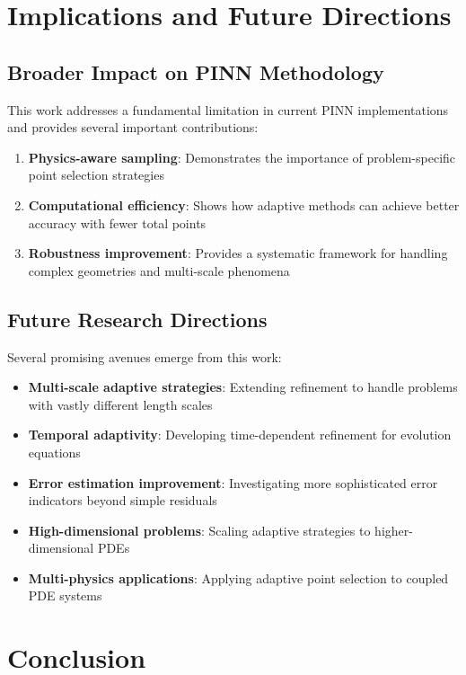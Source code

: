 \documentclass[11pt,a4paper]{article}
\begin{document}
\section{Implications and Future Directions}

\subsection{Broader Impact on PINN Methodology}

This work addresses a fundamental limitation in current PINN implementations and provides several important contributions:

\begin{enumerate}
    \item \textbf{Physics-aware sampling}: Demonstrates the importance of problem-specific point selection strategies
    \item \textbf{Computational efficiency}: Shows how adaptive methods can achieve better accuracy with fewer total points
    \item \textbf{Robustness improvement}: Provides a systematic framework for handling complex geometries and multi-scale phenomena
\end{enumerate}

\subsection{Future Research Directions}

Several promising avenues emerge from this work:

\begin{itemize}
    \item \textbf{Multi-scale adaptive strategies}: Extending refinement to handle problems with vastly different length scales
    \item \textbf{Temporal adaptivity}: Developing time-dependent refinement for evolution equations
    \item \textbf{Error estimation improvement}: Investigating more sophisticated error indicators beyond simple residuals
    \item \textbf{High-dimensional problems}: Scaling adaptive strategies to higher-dimensional PDEs
    \item \textbf{Multi-physics applications}: Applying adaptive point selection to coupled PDE systems
\end{itemize}

\section{Conclusion}
\end{document}
